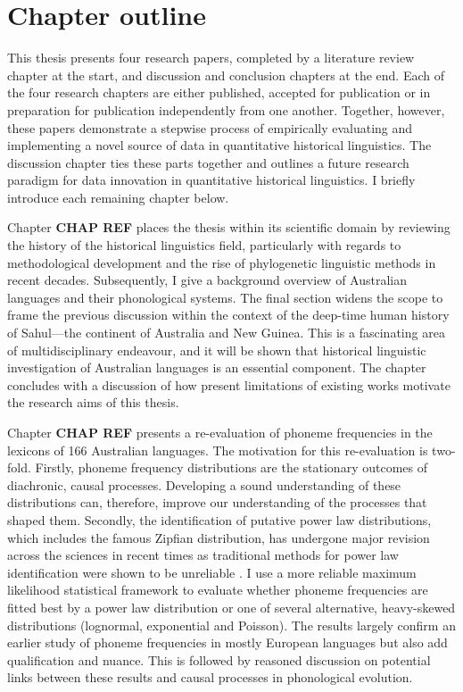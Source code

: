 \hypertarget{intro-chapter-outline}{%
\section{Chapter outline}\label{intro-chapter-outline}}

This thesis presents four research papers, completed by a literature review chapter at the start, and discussion and conclusion chapters at the end. Each of the four research chapters are either published, accepted for publication or in preparation for publication independently from one another. Together, however, these papers demonstrate a stepwise process of empirically evaluating and implementing a novel source of data in quantitative historical linguistics. The discussion chapter ties these parts together and outlines a future research paradigm for data innovation in quantitative historical linguistics. I briefly introduce each remaining chapter below.

Chapter \textbf{CHAP REF} places the thesis within its scientific domain by reviewing the history of the historical linguistics field, particularly with regards to methodological development and the rise of phylogenetic linguistic methods in recent decades. Subsequently, I give a background overview of Australian languages and their phonological systems. The final section widens the scope to frame the previous discussion within the context of the deep-time human history of Sahul---the continent of Australia and New Guinea. This is a fascinating area of multidisciplinary endeavour, and it will be shown that historical linguistic investigation of Australian languages is an essential component. The chapter concludes with a discussion of how present limitations of existing works motivate the research aims of this thesis.

Chapter \textbf{CHAP REF} presents a re-evaluation of phoneme frequencies in the lexicons of 166 Australian languages. The motivation for this re-evaluation is two-fold. Firstly, phoneme frequency distributions are the stationary outcomes of diachronic, causal processes. Developing a sound understanding of these distributions can, therefore, improve our understanding of the processes that shaped them. Secondly, the identification of putative power law distributions, which includes the famous Zipfian distribution, has undergone major revision across the sciences in recent times as traditional methods for power law identification were shown to be unreliable \autocite{clauset_power-law_2009}. I use a more reliable maximum likelihood statistical framework to evaluate whether phoneme frequencies are fitted best by a power law distribution or one of several alternative, heavy-skewed distributions (lognormal, exponential and Poisson). The results largely confirm an earlier study of phoneme frequencies in mostly European languages \autocite{tambovtsev_phoneme_2007} but also add qualification and nuance. This is followed by reasoned discussion on potential links between these results and causal processes in phonological evolution.

